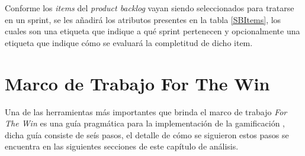  \noindent Conforme los {\it items} del {\it product backlog} vayan siendo seleccionados para
 tratarse en un sprint, se les añadirá los atributos presentes en la tabla \ref{SBItems}, los
 cuales son una etiqueta que indique a qué sprint pertenecen y opcionalmente una etiqueta que
 indique cómo se evaluará la completitud de dicho item.
    


\section{Marco de Trabajo For The Win}
\label{analisis:forthewin}

 Una de las herramientas más importantes que brinda el marco de trabajo {\it For The Win} es
 una guía pragmática para la implementación de la gamificación \cite[p. 8]{ForTheWin}, dicha guía consiste de seís
 pasos, el detalle de cómo se siguieron estos pasos se encuentra en las siguientes secciones
 de este capítulo de análisis.

